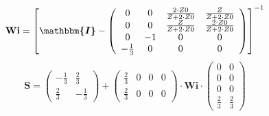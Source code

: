 \[ \mathbf{Wi} =  \left[ \boldsymbol{\mathbbm{I}}  -
\left(\begin{array}{cccc} 0 & 0 & \frac{2\cdot Z0}{Z+2\cdot Z0} &
\frac{Z}{Z+2\cdot Z0} \\ 0 & 0 & \frac{Z}{Z+2\cdot Z0} & \frac{2\cdot
Z0}{Z+2\cdot Z0} \\ 0 & -1 & 0 & 0 \\ -\frac{1}{3} & 0 & 0 & 0
\end{array}\right) \right]^{-1}  \]
\[ \mathbf{S} = \left(\begin{array}{cc} -\frac{1}{3} & \frac{2}{3} \\
\frac{2}{3} & -\frac{1}{3} \end{array}\right) +
\left(\begin{array}{cccc} \frac{2}{3} & 0 & 0 & 0 \\ \frac{2}{3} & 0 &
0 & 0 \end{array}\right) \cdot \mathbf{Wi}
\cdot\left(\begin{array}{cc} 0 & 0 \\ 0 & 0 \\ 0 & 0 \\ \frac{2}{3} &
\frac{2}{3} \end{array}\right) \]
